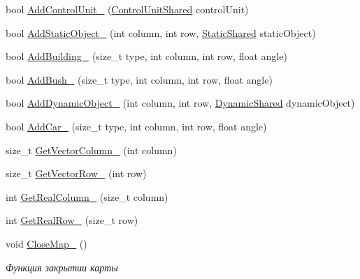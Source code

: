 \begin{DoxyCompactItemize}
\item 
bool \hyperlink{classrtm_1_1_world_controller_a54a03012a522c844563f092e4f0a1e60}{Add\+Control\+Unit\+\_\+} (\hyperlink{namespacertm_a64296d558b2fa02bbf5870afffd61fd9}{Control\+Unit\+Shared} control\+Unit)
\item 
bool \hyperlink{classrtm_1_1_world_controller_a07bb2d2043361ea1768cc157a19c472d}{Add\+Static\+Object\+\_\+} (int column, int row, \hyperlink{namespacertm_a80e2b49f975d8e515a73b3b579b88e07}{Static\+Shared} static\+Object)
\item 
bool \hyperlink{classrtm_1_1_world_controller_ae17e4ffc602819f5b382251b501b1d7c}{Add\+Building\+\_\+} (size\+\_\+t type, int column, int row, float angle)
\item 
bool \hyperlink{classrtm_1_1_world_controller_a9e2fa6b63879171a26eaa0c26eacbc97}{Add\+Bush\+\_\+} (size\+\_\+t type, int column, int row, float angle)
\item 
bool \hyperlink{classrtm_1_1_world_controller_aa886cfea79318d25b2ab69b01c01a5a3}{Add\+Dynamic\+Object\+\_\+} (int column, int row, \hyperlink{namespacertm_af668a936c29b476890a79ad1eb19e3cc}{Dynamic\+Shared} dynamic\+Object)
\item 
bool \hyperlink{classrtm_1_1_world_controller_add7f36a79e7f096c8cf1d7413affec6a}{Add\+Car\+\_\+} (size\+\_\+t type, int column, int row, float angle)
\item 
size\+\_\+t \hyperlink{classrtm_1_1_world_controller_ab88f97b038e03e763c6f863cf38863fb}{Get\+Vector\+Column\+\_\+} (int column)
\item 
size\+\_\+t \hyperlink{classrtm_1_1_world_controller_a294d87950964a203d2b7cc7fb7716168}{Get\+Vector\+Row\+\_\+} (int row)
\item 
int \hyperlink{classrtm_1_1_world_controller_a73f4df1b8493c6d6d0a6b3cdb21a076c}{Get\+Real\+Column\+\_\+} (size\+\_\+t column)
\item 
int \hyperlink{classrtm_1_1_world_controller_a3aad7b071f3e8a80ab159e89ec5c8035}{Get\+Real\+Row\+\_\+} (size\+\_\+t row)
\item 
\mbox{\label{classrtm_1_1_world_controller_a3cd1dce633aa3d4a6991ccf6c367b9a8}} 
void \hyperlink{classrtm_1_1_world_controller_a3cd1dce633aa3d4a6991ccf6c367b9a8}{Close\+Map\+\_\+} ()
\begin{DoxyCompactList}\small\item\em Функция закрытии карты \end{DoxyCompactList}\item 

\end{DoxyCompactItemize}
